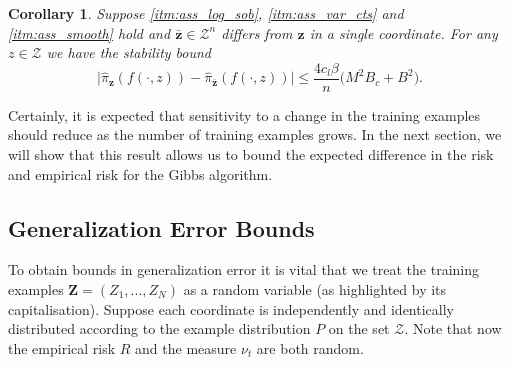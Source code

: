 \documentclass{article}
\newtheorem{corollary}[theorem]{Corollary}
\newcommand{\Bbf}[1]{\mathbf{#1}}
\newcommand{\Bcal}[1]{\mathcal{#1}}
\begin{document}
\begin{corollary}\label{cor:gibbs_stability}
Suppose \ref{itm:ass_log_sob}, \ref{itm:ass_var_cts} and \ref{itm:ass_smooth} hold and \(\bar{\Bbf{z}} \in \Bcal{Z}^n\) differs from \(\Bbf{z}\) in a single coordinate. For any \(z \in \Bcal{Z}\) we have the stability bound
\begin{equation*}
    \big | \hat{\pi}_{\Bbf{z}}(f(\cdot, z)) - \hat{\pi}_{\bar{\Bbf{z}}}(f(\cdot, z)) \big | \leq \frac{4 c_l \beta}{n} \big ( M^2 B_c + B^2 \big ).
\end{equation*}
\end{corollary}

Certainly, it is expected that sensitivity to a change in the training examples should reduce as the number of training examples grows. In the next section, we will show that this result allows us to bound the expected difference in the risk and empirical risk for the Gibbs algorithm.

\subsection{Generalization Error Bounds}
To obtain bounds in generalization error it is vital that we treat the training examples \(\Bbf{Z} = (Z_1, ..., Z_N)\) as a random variable (as highlighted by its capitalisation). Suppose each coordinate is independently and identically distributed according to the example distribution \(P\) on the set \(\Bcal{Z}\). Note that now the empirical risk \(R\) and the measure \(\nu_t\) are both random.
\end{document}
